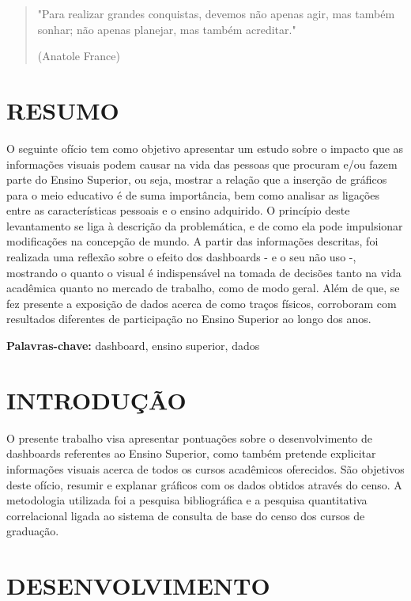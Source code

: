 \documentclass[a4paper,12pt]{article}
\begin{document}
\vspace{2cm}

\begin{quote}
    \centering
    "Para realizar grandes conquistas, devemos não apenas agir, mas também sonhar; não apenas planejar, mas também acreditar." 

    (Anatole France)
\end{quote}

\section{RESUMO}
O seguinte ofício tem como objetivo apresentar um estudo sobre o impacto que as informações visuais podem causar na vida das pessoas que procuram e/ou fazem parte do Ensino Superior, ou seja, mostrar a relação que a inserção de gráficos para o meio educativo é de suma importância, bem como analisar as ligações entre as características pessoais e o ensino adquirido. O princípio deste levantamento se liga à descrição da problemática, e de como ela pode impulsionar modificações na concepção de mundo. A partir das informações descritas, foi realizada uma reflexão sobre o efeito dos dashboards - e o seu não uso -, mostrando o quanto o visual é indispensável na tomada de decisões tanto na vida acadêmica quanto no mercado de trabalho, como de modo geral. Além de que, se fez presente a exposição de dados acerca de como traços físicos, corroboram com resultados diferentes de participação no Ensino Superior ao longo dos anos.

\textbf{Palavras-chave:} dashboard, ensino superior, dados

\newpage

\tableofcontents

\newpage

\section{INTRODUÇÃO}
O presente trabalho visa apresentar pontuações sobre o desenvolvimento de dashboards referentes ao Ensino Superior, como também pretende explicitar informações visuais acerca de todos os cursos acadêmicos oferecidos. São objetivos deste ofício, resumir e explanar gráficos com os dados obtidos através do censo. A metodologia utilizada foi a pesquisa bibliográfica e a pesquisa quantitativa correlacional ligada ao sistema de consulta de base do censo dos cursos de graduação.
\section{DESENVOLVIMENTO}
\end{document}
